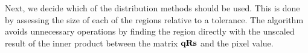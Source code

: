Next, we decide which of the distribution methods should be used. This is done by assessing the size of each of the regions relative to a tolerance. The algorithm avoids unnecessary operations by finding the region directly with the unscaled result of the inner product between the matrix $\qRs$ and the pixel value.
%
%       


